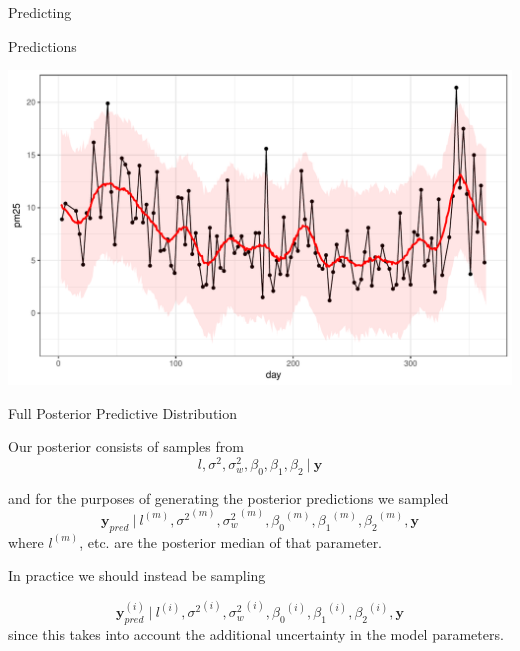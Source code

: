 \documentclass[11pt,ignorenonframetext,]{beamer}
\newenvironment{Shaded}{}{}
\newcommand{\KeywordTok}[1]{\textcolor[rgb]{0.00,0.44,0.13}{\textbf{#1}}}
\newcommand{\DataTypeTok}[1]{\textcolor[rgb]{0.56,0.13,0.00}{#1}}
\newcommand{\StringTok}[1]{\textcolor[rgb]{0.25,0.44,0.63}{#1}}
\newcommand{\OperatorTok}[1]{\textcolor[rgb]{0.40,0.40,0.40}{#1}}
\newcommand{\NormalTok}[1]{#1}
\let\oldShaded\Shaded
\let\endoldShaded\endShaded
\renewenvironment{Shaded}{\footnotesize\begin{spacing}{0.9}\oldShaded}{\endoldShaded\end{spacing}}
\begin{document}
\begin{frame}[fragile,t]{Predicting}
\begin{Shaded}
\begin{Highlighting}[]
{{{{{{{{{\NormalTok{pred_df =}\StringTok{ }\NormalTok{pred }\OperatorTok{%
\end{Highlighting}
\end{Shaded}

\end{frame}

\begin{frame}{Predictions}

\includegraphics{Lec14_files/figure-beamer/unnamed-chunk-5-1.pdf}

\end{frame}

\begin{frame}[t]{Full Posterior Predictive Distribution}

Our posterior consists of samples from
\[ l, \sigma^2, \sigma^2_w, \beta_0, \beta_1, \beta_2 ~|~ \bm{y} \]

and for the purposes of generating the posterior predictions we sampled
\[ \bm{y}_{pred} ~|~ l^{(m)}, {\sigma^2}^{(m)}, {\sigma^2_w}^{(m)}, {\beta_0}^{(m)}, {\beta_1}^{(m)}, {\beta_2}^{(m)}, \bm{y} \]
where \(l^{(m)}\), etc. are the posterior median of that parameter.

\pause

\vspace{5mm}

In practice we should instead be sampling

\[ \bm{y}^{(i)}_{pred} ~|~ l^{(i)}, {\sigma^2}^{(i)}, {\sigma^2_w}^{(i)}, {\beta_0}^{(i)}, {\beta_1}^{(i)}, {\beta_2}^{(i)}, \bm{y} \]
since this takes into account the additional uncertainty in the model
parameters.

\end{frame}
\end{document}
